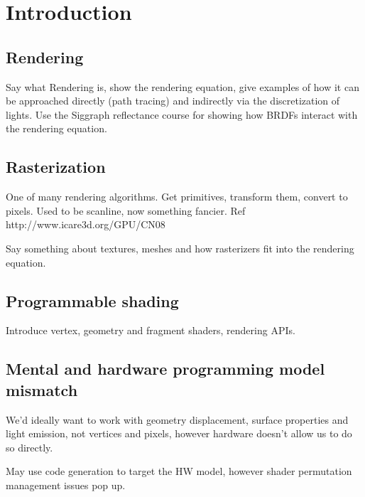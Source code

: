 
\chapter{ Introduction }
\label{Chapter1}

\section{Rendering}

Say what Rendering is, show the rendering equation, give examples of how it can be approached directly (path tracing) and indirectly via the discretization of lights. Use the Siggraph reflectance course for showing how BRDFs interact with the rendering equation.

\section{Rasterization}

One of many rendering algorithms. Get primitives, transform them, convert to pixels. Used to be scanline, now something fancier. Ref http://www.icare3d.org/GPU/CN08

Say something about textures, meshes and how rasterizers fit into the rendering equation.

\section{Programmable shading}

Introduce vertex, geometry and fragment shaders, rendering APIs.

\section{Mental and hardware programming model mismatch}

We'd ideally want to work with geometry displacement, surface properties and light emission, not vertices and pixels, however hardware doesn't allow us to do so directly.

May use code generation to target the HW model, however shader permutation management issues pop up.